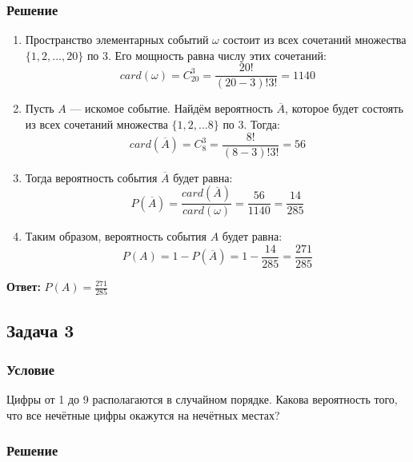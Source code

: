 \documentclass[14pt]{article}
\begin{document}
    \subsubsection*{Решение}

    \begin{enumerate}[wide, labelwidth=!, labelindent=0pt]
        \item Пространство элементарных событий $\omega$ состоит из всех сочетаний множества $\{1, 2, ..., 20\}$ по $3$.
            Его мощность равна числу этих сочетаний:
            \[card (\omega)= C_{20}^3 = \frac{20!}{(20 - 3)!3!} = 1140\]
        \item Пусть $A$ --- искомое событие. Найдём вероятность $\overline{A}$, которое будет состоять из всех сочетаний множества $\{1,2,...8\}$ по $3$.
            Тогда:
            \[card (\overline{A}) = C_{8}^3 = \frac{8!}{(8 - 3)!3!} = 56\]
        \item Тогда вероятность события $\overline{A}$ будет равна:
            \[P(\overline{A}) = \frac{card(\overline{A})}{card(\omega)} = \frac{56}{1140} = \frac{14}{285}\]
        \item Таким образом, вероятность события $A$ будет равна:
            \[P(A) = 1 - P(\overline{A}) = 1 - \frac{14}{285} = \frac{271}{285}\]
    \end{enumerate}
    \hspace{290pt}\textbf{Ответ:} $P(A) = \frac{271}{285}$

    \newpage

    \subsection*{Задача 3}
    \subsubsection*{Условие}

    Цифры от 1 до 9 располагаются в случайном порядке.
    Какова вероятность того, что все нечётные цифры окажутся на нечётных местах?

    \subsubsection*{Решение}
\end{document}
